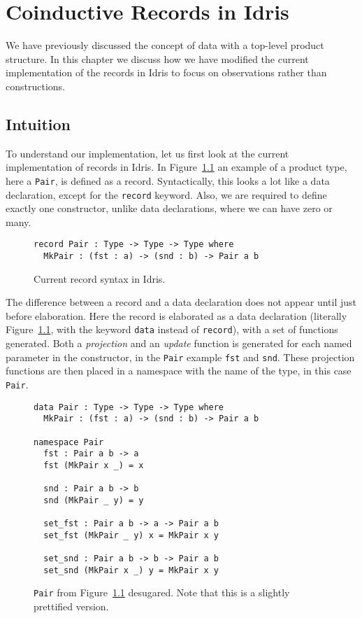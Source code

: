 \chapter{Coinductive Records in Idris}
\label{cha:coind-records-idris}
We have previously discussed the concept of data with a top-level product
structure. In this chapter we discuss how we have modified the current
implementation of the records in Idris to focus on observations rather
than constructions.

\section{Intuition}
To understand our implementation, let us first look at the current
implementation of records in Idris. In Figure~\ref{fig:records_in_idris} an
example of a product type, here a \texttt{Pair}, is defined as a
record. Syntactically, this looks a lot like a data declaration, except for the
\texttt{record} keyword. Also, we are required to define exactly one
constructor, unlike data declarations, where we can have zero or many.

\begin{figure}[h]
\begin{lstlisting}
record Pair : Type -> Type -> Type where
  MkPair : (fst : a) -> (snd : b) -> Pair a b
\end{lstlisting}
  \caption{Current record syntax in Idris.}
  \label{fig:records_in_idris}
\end{figure}

The difference between a record and a data declaration does not appear until just
before elaboration. Here the record is elaborated as a data declaration
(literally Figure~\ref{fig:records_in_idris}, with the keyword \texttt{data}
instead of \texttt{record}), with a set of functions generated. Both a
\emph{projection} and an \emph{update} function is generated for each named
parameter in the constructor, in the \texttt{Pair} example \texttt{fst} and
\texttt{snd}. These projection functions are then placed in a namespace with the
name of the type, in this case \texttt{Pair}. 

\begin{figure}[h]
\begin{lstlisting}
data Pair : Type -> Type -> Type where
  MkPair : (fst : a) -> (snd : b) -> Pair a b

namespace Pair
  fst : Pair a b -> a
  fst (MkPair x _) = x

  snd : Pair a b -> b
  snd (MkPair _ y) = y

  set_fst : Pair a b -> a -> Pair a b
  set_fst (MkPair _ y) x = MkPair x y

  set_snd : Pair a b -> b -> Pair a b
  set_snd (MkPair x _) y = MkPair x y
\end{lstlisting}
  \caption{\texttt{Pair} from Figure~\ref{fig:records_in_idris} desugared. Note
    that this is a slightly prettified version.}
  \label{fig:pair_desugared}
\end{figure}

